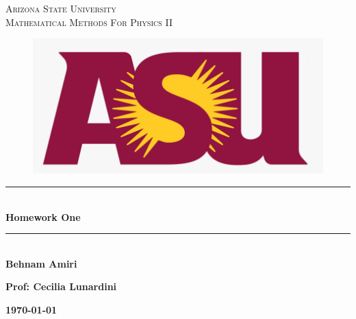 \documentclass[fleqn]{article}
\begin{document}
  \begin{titlepage}

    \newcommand{\HRule}{\rule{\linewidth}{0.5mm}} %

    \center %



    \textsc{\LARGE Arizona State University}\\[1.5cm] %

    \textsc{\LARGE Mathematical Methods For Physics II }\\[1.5cm] %


    \begin{figure}
      \includegraphics[width=\linewidth]{asu.png}
    \end{figure}


    \HRule \\[0.4cm]
    { \huge \bfseries Homework One}\\[0.4cm] 
    \HRule \\[1.5cm]

    \textbf{Behnam Amiri}

    \bigbreak

    \textbf{Prof: Cecilia Lunardini}

    \bigbreak


    \textbf{{\large \today}\\[2cm]}

    \vfill %

  \end{titlepage}
\end{document}
